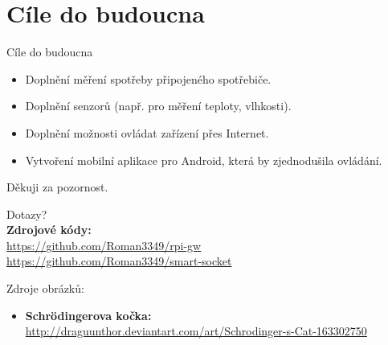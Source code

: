 \documentclass[11pt]{beamer}
\begin{document}
\section{Cíle do budoucna}

\begin{frame}{Cíle do budoucna}
  \begin{itemize}
    \item Doplnění měření spotřeby připojeného spotřebiče.
    \item Doplnění senzorů (např. pro měření teploty, vlhkosti).
    \item Doplnění možnosti ovládat zařízení přes Internet.
    \item Vytvoření mobilní aplikace pro Android, která by zjednodušila ovládání.
  \end{itemize}
\end{frame}

\begin{frame}
  \begin{center}
    \begin{huge}
    Děkuji za pozornost. \\[8mm]
    \end{huge}
    \large{Dotazy?}\\[16mm]
    \textbf{Zdrojové kódy:} \\
    \url{https://github.com/Roman3349/rpi-gw} \\
    \url{https://github.com/Roman3349/smart-socket} \\[16mm]
  \end{center}
  Zdroje obrázků:
  \begin{itemize}
    \item[] \hspace{-8mm} \tiny{\textbf{Schrödingerova kočka:} \url{http://draguunthor.deviantart.com/art/Schrodinger-s-Cat-163302750}}
  \end{itemize}
\end{frame}
\end{document}
